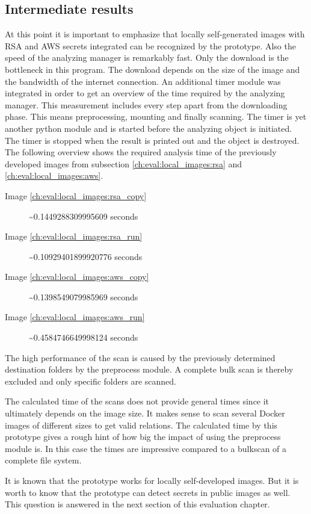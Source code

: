 \subsection{Intermediate results}
At this point it is important to emphasize that locally self-generated images with RSA and AWS secrets integrated can be recognized by the prototype.
Also the speed of the analyzing manager is remarkably fast. 
Only the download is the bottleneck in this program. 
The download depends on the size of the image and the bandwidth of the internet connection.
An additional timer module was integrated in order to get an overview of the time required by the analyzing manager.
This measurement includes every step apart from the downloading phase. This means preprocessing, mounting and finally scanning.
The timer is yet another python module and is started before the analyzing object is initiated. 
The timer is stopped when the result is printed out and the object is destroyed.
The following overview shows the required analysis time of the previously developed images from subsection \ref{ch:eval:local_images:rsa} and \ref{ch:eval:local_images:aws}. 
\begin{description}
\item [Image \ref{ch:eval:local_images:rsa_copy}] \textasciitilde 0.1449288309995609 seconds
\item [Image \ref{ch:eval:local_images:rsa_run}] \textasciitilde 0.10929401899920776 seconds
\item [Image \ref{ch:eval:local_images:aws_copy}] \textasciitilde 0.1398549079985969 seconds
\item [Image \ref{ch:eval:local_images:aws_run}] \textasciitilde 0.4584746649998124 seconds
\end{description}
The high performance of the scan is caused by the previously determined destination folders by the preprocess module.
A complete bulk scan is thereby excluded and only specific folders are scanned.

The calculated time of the scans does not provide general times since it ultimately depends on the image size. 
It makes sense to scan several Docker images of different sizes to get valid relations.
The calculated time by this prototype gives a rough hint of how big the impact of using the preprocess module is.
In this case the times are impressive compared to a bulkscan of a complete file system.

It is known that the prototype works for locally self-developed images. 
But it is worth to know that the prototype can detect secrets in public images as well.
This question is answered in the next section of this evaluation chapter.